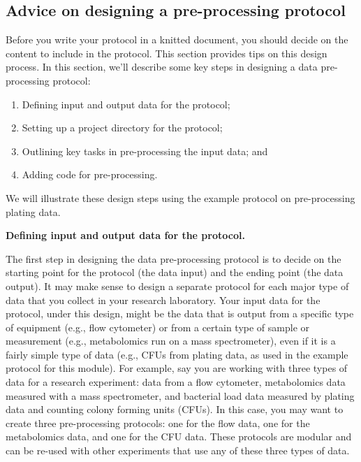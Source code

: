 \documentclass[]{tufte-book}
\providecommand{\tightlist}{%
  \setlength{\itemsep}{0pt}\setlength{\parskip}{0pt}}
\begin{document}
\subsection{Advice on designing a pre-processing protocol}\label{advice-on-designing-a-pre-processing-protocol}

Before you write your protocol in a knitted document, you should decide on the
content to include in the protocol. This section provides tips on this design
process. In this section, we'll describe some key steps in designing a
data pre-processing protocol:

\begin{enumerate}
\def\labelenumi{\arabic{enumi}.}
\tightlist
\item
  Defining input and output data for the protocol;
\item
  Setting up a project directory for the protocol;
\item
  Outlining key tasks in pre-processing the input data; and
\item
  Adding code for pre-processing.
\end{enumerate}

We will illustrate these design steps using the example protocol on
pre-processing plating data.

\textbf{Defining input and output data for the protocol.}

The first step in designing the data pre-processing protocol is to decide on the
starting point for the protocol (the data input) and the ending point (the data
output). It may make sense to design a separate protocol for each major type of
data that you collect in your research laboratory. Your input data for the
protocol, under this design, might be the data that is output from a specific
type of equipment (e.g., flow cytometer) or from a certain type of sample or
measurement (e.g., metabolomics run on a mass spectrometer), even if it is a
fairly simple type of data (e.g., CFUs from plating data, as used in the example
protocol for this module). For example, say you are working with three types of
data for a research experiment: data from a flow cytometer, metabolomics data
measured with a mass spectrometer, and bacterial load data measured by plating
data and counting colony forming units (CFUs). In this case, you may want to
create three pre-processing protocols: one for the flow data, one for the
metabolomics data, and one for the CFU data. These protocols are modular and can
be re-used with other experiments that use any of these three types of data.
\end{document}
